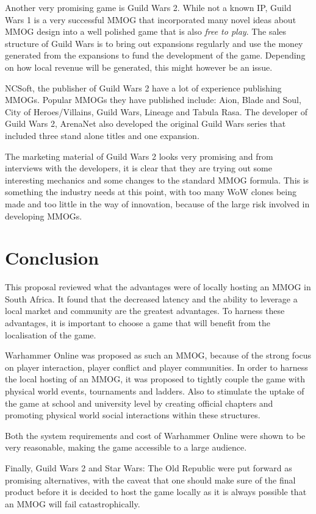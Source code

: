 \documentclass[journal,oneside,a4paper,onecolumn]{IEEEtran}
\begin{document}
Another very promising game is Guild Wars 2. While not a known IP, Guild Wars 1 is a very successful MMOG that incorporated many novel ideas about
MMOG design into a well polished game that is also \emph{free to play}. The sales structure of Guild Wars is to bring out expansions regularly and
use the money generated from the expansions to fund the development of the game. Depending on how local revenue will be generated, this might however
be an issue.

NCSoft, the publisher of Guild Wars 2 have a lot of experience publishing MMOGs. Popular MMOGs they have published include: Aion, Blade and Soul,
City of Heroes/Villains, Guild Wars, Lineage and Tabula Rasa. The developer of Guild Wars 2, ArenaNet also developed the original Guild Wars series
that included three stand alone titles and one expansion.

The marketing material of Guild Wars 2 looks very promising and from interviews with the developers, it is clear that they are trying out some
interesting mechanics and some changes to the standard MMOG formula. This is something the industry needs at this point, with too many WoW clones
being made and too little in the way of innovation, because of the large risk involved in developing MMOGs.

\section{Conclusion}


This proposal reviewed what the advantages were of locally hosting an MMOG in South Africa. It found that the decreased latency and the ability to
leverage a local market and community are the greatest advantages. To harness these advantages, it is important to choose a game that will benefit
from the localisation of the game.

Warhammer Online was proposed as such an MMOG, because of the strong focus on player interaction, player conflict and player communities. In order to
harness the local hosting of an MMOG, it was proposed to tightly couple the game with physical world events, tournaments and ladders. Also to
stimulate the uptake of the game at school and university level by creating official chapters and promoting physical world social interactions within
these structures.

Both the system requirements and cost of Warhammer Online were shown to be very reasonable, making the game accessible to a large audience.

Finally, Guild Wars 2 and Star Wars: The Old Republic were put forward as promising alternatives, with the caveat that one should make sure of the
final product before it is decided to host the game locally as it is always possible that an MMOG will fail catastrophically.

\end{document}
